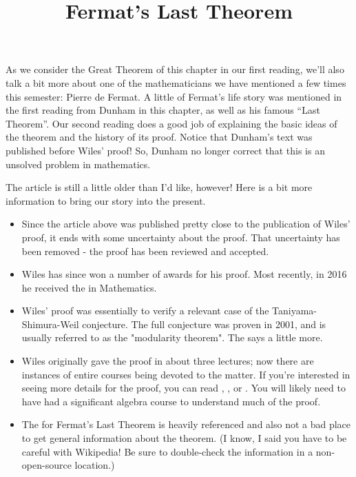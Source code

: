 \documentclass[nooutcomes]{ximera}
\title{Fermat's Last Theorem}
\begin{document}
\begin{abstract}
    
\end{abstract}
\maketitle

As we consider the Great Theorem of this chapter in our first reading,
we'll also talk a bit more about one of the mathematicians we have
mentioned a few times this semester: Pierre de Fermat.  A little of
Fermat's life story was mentioned in the first reading from Dunham in
this chapter, as well as his famous ``Last Theorem''.  Our second
reading does a good job of explaining the basic ideas of the theorem
and the history of its proof.  Notice that Dunham's text was published
before Wiles' proof!  So, Dunham no longer correct that this is an
unsolved problem in mathematics.

The article is still a little older than I'd like, however!  Here is a
bit more information to bring our story into the present.
\begin{itemize}
	\item Since the article above was published pretty close to
          the publication of Wiles' proof, it ends with some
          uncertainty about the proof.  That uncertainty has been
          removed - the proof has been reviewed and accepted.
	\item Wiles has since won a number of awards for his proof.  Most recently, in 2016 he received the  in Mathematics.  
	\item Wiles' proof was essentially to verify a relevant case
          of the Taniyama-Shimura-Weil conjecture.  The full
          conjecture was proven in 2001, and is usually referred to as
          the "modularity theorem".  The 
          says a little more.
	\item Wiles originally gave the proof in about three lectures; now there are instances of entire courses being devoted to the matter.  If you're interested in seeing more details for the proof, you can read , , or .  You will likely need to have had a significant algebra course to understand much of the proof.
	\item The  for Fermat's Last Theorem is heavily referenced and also not a bad place to get general information about the theorem.  (I know, I said you have to be careful with Wikipedia!  Be sure to double-check the information in a non-open-source location.)
\end{itemize}
\end{document}

